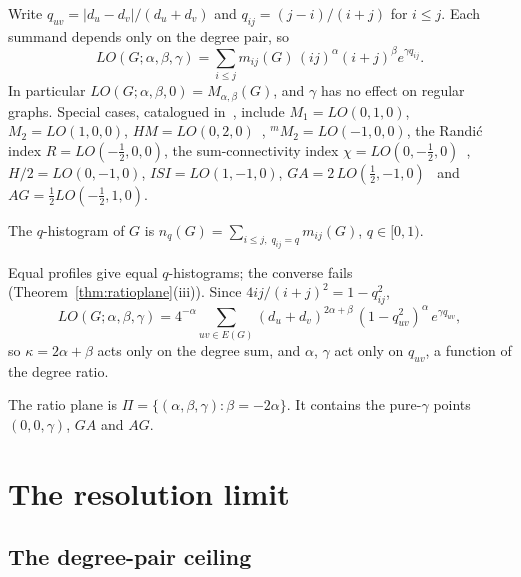 Write $q_{uv} = |d_u - d_v|/(d_u + d_v)$ and $q_{ij} = (j-i)/(i+j)$ for
$i \le j$. Each summand depends only on the degree pair, so
\begin{equation}\label{eq:pairsum}
LO(G;\alpha,\beta,\gamma) = \sum_{i \le j} m_{ij}(G)\,
(ij)^{\alpha}(i+j)^{\beta} e^{\gamma q_{ij}} .
\end{equation}
In particular $LO(G;\alpha,\beta,0) = M_{\alpha,\beta}(G)$, and $\gamma$
has no effect on regular graphs. Special cases, catalogued
in~\cite{MolinaSigarreta2025GM}, include $M_1 = LO(0,1,0)$,
$M_2 = LO(1,0,0)$, $HM = LO(0,2,0)$~\cite{ShirdelRezapourSayadi2013HM},
${}^{m}\!M_2 = LO(-1,0,0)$, the Randi\'c index $R = LO(-\tfrac12,0,0)$,
the sum-connectivity index
$\chi = LO(0,-\tfrac12,0)$~\cite{ZhouTrinajstic2009sumconn},
$H/2 = LO(0,-1,0)$, $ISI = LO(1,-1,0)$,
$GA = 2\,LO(\tfrac12,-1,0)$~\cite{VukicevicFurtula2009GA} and
$AG = \tfrac12 LO(-\tfrac12,1,0)$.

\begin{definition}[$q$-histogram]\label{def:qhist}
The $q$-histogram of $G$ is
$n_q(G) = \sum_{i \le j,\; q_{ij} = q} m_{ij}(G)$, $q \in [0,1)$.
\end{definition}

Equal profiles give equal $q$-histograms; the converse fails
(Theorem~\ref{thm:ratioplane}(iii)). Since $4ij/(i+j)^2 = 1 - q_{ij}^2$,
\begin{equation}\label{eq:factor}
LO(G;\alpha,\beta,\gamma) = 4^{-\alpha} \sum_{uv \in E(G)}
(d_u + d_v)^{2\alpha+\beta}\,(1 - q_{uv}^2)^{\alpha}\, e^{\gamma q_{uv}},
\end{equation}
so $\kappa = 2\alpha + \beta$ acts only on the degree sum, and $\alpha$,
$\gamma$ act only on $q_{uv}$, a function of the degree ratio.

\begin{definition}\label{def:ratioplane}
The ratio plane is
$\Pi = \{(\alpha,\beta,\gamma) : \beta = -2\alpha\}$. It contains the
pure-$\gamma$ points $(0,0,\gamma)$, $GA$ and $AG$.
\end{definition}

\section{The resolution limit}\label{sec:limit}

\subsection{The degree-pair ceiling}\label{sec:ceiling}

